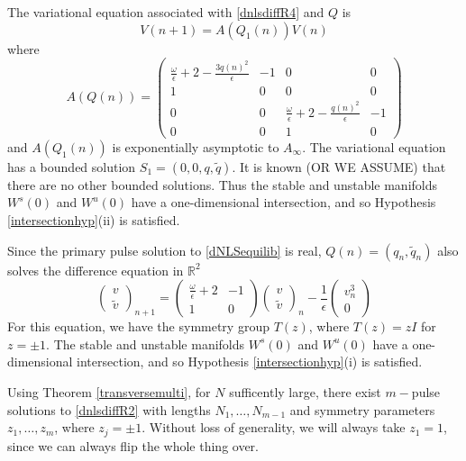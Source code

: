\documentclass[12pt]{article}
\def\R{{\mathbb R}}
\begin{document}
The variational equation associated with \eqref{dnlsdiffR4} and $Q$ is 
\begin{equation}\label{vareqdNLS}
V(n+1) = A(Q_1(n)) V(n)
\end{equation}
where
\begin{equation}\label{AQdNLS}
A(Q(n)) = 
\begin{pmatrix}
\frac{\omega}{\epsilon} + 2 - \frac{3 q(n)^2}{\epsilon} & -1 & 0 & 0 \\
1 & 0 & 0 & 0 \\
0 & 0 & \frac{\omega}{\epsilon} + 2 - \frac{q(n)^2}{\epsilon} & -1 \\
0 & 0 & 1 & 0
\end{pmatrix}
\end{equation}
and $A(Q_1(n))$ is exponentially asymptotic to $A_\infty$. The variational equation has a bounded solution $S_1 = (0, 0, q, \tilde{q})$. It is known (OR WE ASSUME) that there are no other bounded solutions. Thus the stable and unstable manifolds $W^s(0)$ and $W^u(0)$ have a one-dimensional intersection, and so Hypothesis \ref{intersectionhyp}(ii) is satisfied.

Since the primary pulse solution to \eqref{dNLSequilib} is real, $Q(n) = (q_n, \tilde{q}_n)$ also solves the difference equation in $\R^2$
\begin{equation}\label{dnlsdiffR2}
\begin{pmatrix}
v \\ \tilde{v}
\end{pmatrix}_{n+1} =
\begin{pmatrix}
\frac{\omega}{\epsilon} + 2 & -1 \\
1 & 0 
\end{pmatrix}
\begin{pmatrix}
v \\ \tilde{v}
\end{pmatrix}_n
- \frac{1}{\epsilon} 
\begin{pmatrix} v_n^3 \\ 0 
\end{pmatrix}
\end{equation}
For this equation, we have the symmetry group $T(z)$, where $T(z) = z I$ for $z = \pm 1$. The stable and unstable manifolds $W^s(0)$ and $W^u(0)$ have a one-dimensional intersection, and so Hypothesis \ref{intersectionhyp}(i) is satisfied.

Using Theorem \ref{transversemulti}, for $N$ sufficently large, there exist $m-$pulse solutions to \eqref{dnlsdiffR2} with lengths $N_1, \dots, N_{m-1}$ and symmetry parameters $z_1, \dots, z_m$, where $z_j = \pm 1$. Without loss of generality, we will always take $z_1 = 1$, since we can always flip the whole thing over.
\end{document}
